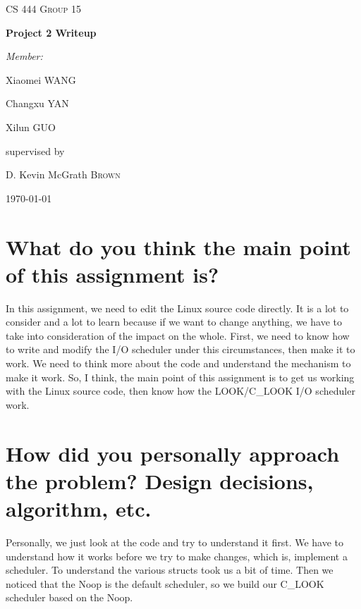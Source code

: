 \documentclass[letterpaper,10pt]{article}
\begin{document}
\begin{titlepage}
\begin{center}
    \vfill
    \textsc{\LARGE CS 444 Group 15}\par
    \vspace{1cm}
    { \huge \bfseries Project 2 Writeup\par}
    \vfill
    \emph{Member:}\par
    \vspace{.5cm}
    Xiaomei \textsc{WANG}\par
    \vspace{.5cm}
    Changxu \textsc{YAN}\par
    \vspace{.5cm}
    Xilun \textsc{GUO}\par
    \vfill
    supervised by\par
    D. Kevin McGrath \textsc{Brown}

    \vfill

    {\large \today\par}
\end{center}
\end{titlepage}

\section*{What do you think the main point of this assignment is?}

In this assignment, we need to edit the Linux source code directly. It is a lot to consider and a lot to learn because if we want to change anything, we have to take into consideration of the impact on the whole. First, we need to know how to write and modify the I/O scheduler under this circumstances, then make it to work. We need to think more about the code and understand the mechanism to make it work. So, I think, the main point of this assignment is to get us working with the Linux source code, then know how the LOOK/C\_LOOK I/O scheduler work.

\section*{How did you personally approach the problem? Design decisions, algorithm, etc.}

Personally, we just look at the code and try to understand it first. We have to understand how it works before we try to make changes, which is, implement a scheduler. To understand the various structs took us a bit of time. Then we noticed that the Noop is the default scheduler, so we build our C\_LOOK scheduler based on the Noop. 
\end{document}
